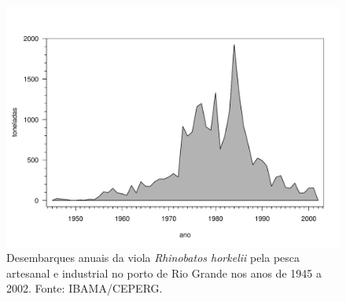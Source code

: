 \documentclass[a4paper,11pt,twoside,showtrims,onecolumn,openright,final]{memoir}
\begin{document}
\begin{figure}
\begin{center}
\includegraphics[width=\textwidth]{DESEMBARQUESTOTAISVIOLA}
\end{center}
\caption[Desembarques anuais da viola \emph{Rhinobatos horkelii} entre 1945 e 2002]
	{Desembarques anuais da viola \emph{Rhinobatos horkelii}
	 pela pesca artesanal e industrial no porto de Rio Grande 
	 nos anos de 1945 a 2002. Fonte: IBAMA/CEPERG.}
\label{fig:viola-desembarques-1945a2002}
\end{figure}


%
%
\end{document}
